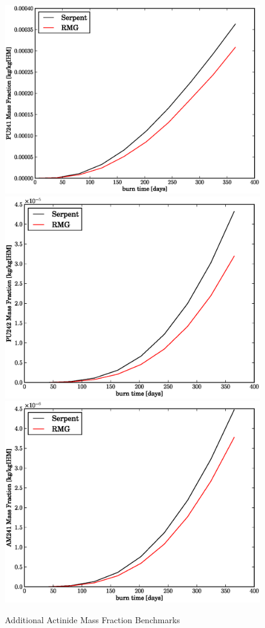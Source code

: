 \begin{figure}[htbp]
\caption{Additional Actinide Mass Fraction Benchmarks}
\label{act_benchmark_cont}
\begin{center}
\includegraphics[scale=0.3]{multigroup_method/figs/benchmark/PU241_Mass_Fraction_.eps}
\includegraphics[scale=0.3]{multigroup_method/figs/benchmark/PU242_Mass_Fraction_.eps}
\includegraphics[scale=0.3]{multigroup_method/figs/benchmark/AM241_Mass_Fraction_.eps}

\end{center}
\end{figure}
